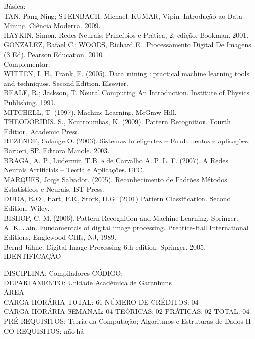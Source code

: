 \documentclass[
	12pt,				%
	openright,			%
  oneside,     %
	a4paper,			%
	english,			%
	french,				%
	spanish,			%
	brazil				%
	]{abntex2}
\begin{document}
\begin{apendicesenv}
Básica:\\
TAN, Pang-Ning; STEINBACH; Michael; KUMAR, Vipin. Introdução ao Data
Mining. Ciência Moderna. 2009.\\
HAYKIN, Simon. Redes Neurais: Princípios e Prática, 2. edição. Bookman.
2001.\\
GONZALEZ, Rafael C.; WOODS, Richard E.. Processamento Digital De Imagens
(3 Ed). Pearson Education. 2010.\\
Complementar:\\
WITTEN, I. H., Frank, E. (2005). Data mining : practical machine
learning tools and techniques. Second Edition. Elsevier.\\
BEALE, R.; Jackson, T. Neural Computing  An Introduction. Institute
of Physics Publishing. 1990.\\
MITCHELL, T. (1997). Machine Learning. McGraw-Hill.\\
THEODORIDIS. S., Koutroumbas, K. (2009). Pattern Recognition. Fourth
Edition, Academic Press.\\
REZENDE, Solange O. (2003). Sistemas Inteligentes -- Fundamentos e
aplicações. Barueri, SP. Editora Manole. 2003.\\
BRAGA, A. P., Ludermir, T.B. e de Carvalho A. P. L. F. (2007). A Redes
Neurais Artificiais -- Teoria e Aplicações. LTC.\\
MARQUES, Jorge Salvador. (2005). Reconhecimento de Padrões  Métodos
Estatísticos e Neurais. IST Press.\\
DUDA, R.O., Hart, P.E., Stork, D.G. (2001) Pattern Classification.
Second Edition. Wiley.\\
BISHOP, C. M. (2006). Pattern Recognition and Machine Learning.
Springer.\\
A. K. Jain. Fundamentals of digital image processing. Prentice-Hall
International Editions, Englewood Cliffs, NJ, 1989.\\
Bernd Jähne. Digital Image Processing 6th edition. Springer. 2005.\\


\newpage IDENTIFICAÇÃO

DISCIPLINA: Compiladores CÓDIGO:\\ 
DEPARTAMENTO: Unidade Acadêmica de Garanhuns\\
ÁREA: \\
CARGA HORÁRIA TOTAL: 60 NÚMERO DE CRÉDITOS: 04\\
CARGA HORÁRIA SEMANAL: 04 TEÓRICAS: 02 PRÁTICAS: 02 TOTAL: 04\\
PRÉ-REQUISITOS: Teoria da Computação; Algoritmos e Estruturas de Dados II\\
CO-REQUISITOS: não há


\end{apendicesenv}
\end{document}
